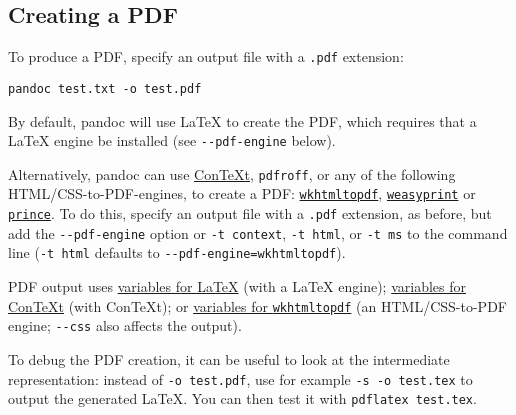 \documentclass[
]{article}
\begin{document}
\hypertarget{creating-a-pdf}{%
\subsection{Creating a PDF}\label{creating-a-pdf}}

To produce a PDF, specify an output file with a \texttt{.pdf} extension:

\begin{verbatim}
pandoc test.txt -o test.pdf
\end{verbatim}

By default, pandoc will use LaTeX to create the PDF, which requires that
a LaTeX engine be installed (see \texttt{-\/-pdf-engine} below).

Alternatively, pandoc can use
\href{http://www.contextgarden.net/}{ConTeXt}, \texttt{pdfroff}, or any
of the following HTML/CSS-to-PDF-engines, to create a PDF:
\href{https://wkhtmltopdf.org}{\texttt{wkhtmltopdf}},
\href{http://weasyprint.org}{\texttt{weasyprint}} or
\href{https://www.princexml.com/}{\texttt{prince}}. To do this, specify
an output file with a \texttt{.pdf} extension, as before, but add the
\texttt{-\/-pdf-engine} option or \texttt{-t\ context},
\texttt{-t\ html}, or \texttt{-t\ ms} to the command line
(\texttt{-t\ html} defaults to \texttt{-\/-pdf-engine=wkhtmltopdf}).

PDF output uses \protect\hyperlink{variables-for-latex}{variables for
LaTeX} (with a LaTeX engine);
\protect\hyperlink{variables-for-context}{variables for ConTeXt} (with
ConTeXt); or \protect\hyperlink{variables-for-wkhtmltopdf}{variables for
\texttt{wkhtmltopdf}} (an HTML/CSS-to-PDF engine; \texttt{-\/-css} also
affects the output).

To debug the PDF creation, it can be useful to look at the intermediate
representation: instead of \texttt{-o\ test.pdf}, use for example
\texttt{-s\ -o\ test.tex} to output the generated LaTeX. You can then
test it with \texttt{pdflatex\ test.tex}.
\end{document}
